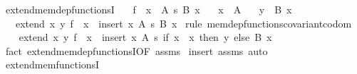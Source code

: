 \begin{isabellebody}
\endisatagproof
{\isafoldproof}%
%
\isadelimproof
\isanewline
%
\endisadelimproof
\isanewline
{}\isamarkupfalse%
\ extend{\isacharunderscore}{\kern0pt}mem{\isacharunderscore}{\kern0pt}dep{\isacharunderscore}{\kern0pt}functionsI{\isacharprime}{\kern0pt}{\isacharcolon}{\kern0pt}\isanewline
\ \ \ {\isachardoublequoteopen}f\ {\isasymin}\ {\isacharparenleft}{\kern0pt}x\ {\isasymin}\ A{\isacharparenright}{\kern0pt}\ {\isasymrightarrow}s\ {\isacharparenleft}{\kern0pt}B\ x{\isacharparenright}{\kern0pt}{\isachardoublequoteclose}\isanewline
\ \ \ {\isachardoublequoteopen}x\ {\isasymnotin}\ A{\isachardoublequoteclose}\isanewline
\ \ \ {\isachardoublequoteopen}y\ {\isasymin}\ B\ x{\isachardoublequoteclose}\isanewline
\ \ \ {\isachardoublequoteopen}extend\ x\ y\ f\ {\isasymin}\ {\isacharparenleft}{\kern0pt}x\ {\isasymin}\ insert\ x\ A{\isacharparenright}{\kern0pt}\ {\isasymrightarrow}s\ {\isacharparenleft}{\kern0pt}B\ x{\isacharparenright}{\kern0pt}{\isachardoublequoteclose}\isanewline
%
\isadelimproof
%
\endisadelimproof
%
\isatagproof
{}\isamarkupfalse%
\ {\isacharparenleft}{\kern0pt}rule\ mem{\isacharunderscore}{\kern0pt}dep{\isacharunderscore}{\kern0pt}functions{\isacharunderscore}{\kern0pt}covariant{\isacharunderscore}{\kern0pt}codom{\isacharparenright}{\kern0pt}\isanewline
\ \ \isamarkupfalse%
\ {\isachardoublequoteopen}extend\ x\ y\ f\ {\isasymin}\ {\isacharparenleft}{\kern0pt}x{\isacharprime}{\kern0pt}\ {\isasymin}\ insert\ x\ A{\isacharparenright}{\kern0pt}\ {\isasymrightarrow}s\ {\isacharparenleft}{\kern0pt}if\ x{\isacharprime}{\kern0pt}\ {\isacharequal}{\kern0pt}\ x\ then\ {\isacharbraceleft}{\kern0pt}y{\isacharbraceright}{\kern0pt}\ else\ B\ x{\isacharprime}{\kern0pt}{\isacharparenright}{\kern0pt}{\isachardoublequoteclose}\isanewline
\ \ \ \ \isamarkupfalse%
\ {\isacharparenleft}{\kern0pt}fact\ extend{\isacharunderscore}{\kern0pt}mem{\isacharunderscore}{\kern0pt}dep{\isacharunderscore}{\kern0pt}functionsI{\isacharbrackleft}{\kern0pt}OF\ assms{\isacharparenleft}{\kern0pt}{}{\isacharminus}{\kern0pt}{}{\isacharparenright}{\kern0pt}{\isacharbrackright}{\kern0pt}{\isacharparenright}{\kern0pt}\isanewline
{}\isamarkupfalse%
\ {\isacharparenleft}{\kern0pt}insert\ assms{\isacharcomma}{\kern0pt}\ auto{\isacharparenright}{\kern0pt}%
\endisatagproof
{\isafoldproof}%
%
\isadelimproof
\isanewline
%
\endisadelimproof
\isanewline
{}\isamarkupfalse%
\ extend{\isacharunderscore}{\kern0pt}mem{\isacharunderscore}{\kern0pt}functionsI{\isacharcolon}{\kern0pt}\isanewline

\end{isabellebody}
